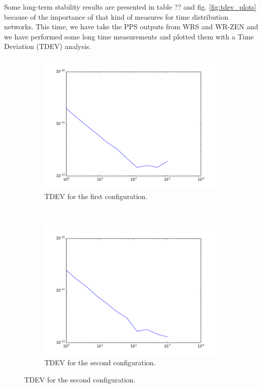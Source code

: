Some long-term stability results are presented in table ?? and fig. \ref{fig:tdev_plots} because of the importance of that kind of measures for time distribution networks. This time, we have take the PPS outputs from WRS and WR-ZEN and we have performed some long time measurements and plotted them with a Time Deviation (TDEV) analysis.

\begin{figure}
    \begin{subfigure}[t]{.45\textwidth}
        \centering
        \includegraphics[width=\textwidth]{img/pps_p1.png}
        \caption{TDEV for the first configuration.}
        \label{fig:pps_p1}
    \end{subfigure}
    ~
    \begin{subfigure}[t]{.45\textwidth}
        \centering
        \includegraphics[width=\textwidth]{img/pps_p2.png}
        \caption{TDEV for the second configuration.}
        \label{fig:pps_p2}
    \end{subfigure}
    

\end{figure}
